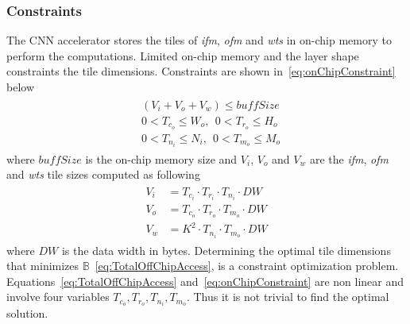 \documentclass[a4paper,10pt]{article}
\newcommand{\numBytesOffChip}{\mathbb{B}}
\newcommand{\dataWidth}{DW}
\newcommand{\BuffSize}{buffSize}
\begin{document}
\subsubsection{Constraints}
The CNN accelerator stores the tiles of \textit{ifm}, \textit{ofm} and \textit{wts} in on-chip memory to perform the computations. Limited on-chip memory and the layer shape constraints the tile dimensions. Constraints are shown in~\eqref{eq:onChipConstraint} below
\begin{align}\label{eq:onChipConstraint}
	\begin{split}
		&(V_{i}{+}V_{o}{+}V_{w})\leq \BuffSize \\
		&0<T_{c_o}\leq W_o,~\ 0<T_{r_o}\leq H_o\\
		&0<T_{n_i}\leq N_i,~\ 0<T_{m_o}\leq M_o
	\end{split}
\end{align}
where $\BuffSize$ is the on-chip memory size and $V_{i}$, $V_{o}$ and $V_{w}$ are the \textit{ifm}, \textit{ofm} and \textit{wts} tile sizes computed as following 
\begin{align}\label{eq:tilesVol}
	\begin{split}
		V_{i}&=T_{c_i}{\cdot} T_{r_i}{\cdot} T_{n_i}{\cdot}\dataWidth\\
		V_{o}&=T_{c_o}{\cdot} T_{r_o}{\cdot} T_{m_o}{\cdot}\dataWidth\\
		V_{w}&=K^2{\cdot} T_{n_i}{\cdot} T_{m_o}{\cdot}\dataWidth
	\end{split}
\end{align}
where $\dataWidth$ is the data width in bytes.
Determining the optimal tile dimensions that minimizes $\numBytesOffChip$~\eqref{eq:TotalOffChipAccess}, is a constraint optimization problem. Equations~\eqref{eq:TotalOffChipAccess} and~\eqref{eq:onChipConstraint} are non linear and involve four variables $T_{c_o},T_{r_o},T_{n_i},T_{m_o}$. Thus it is not trivial to find the optimal solution.
\end{document}
